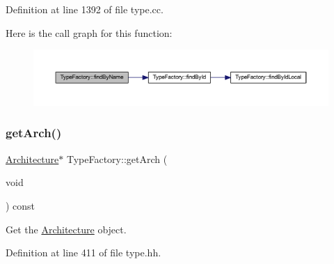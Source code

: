 Definition at line 1392 of file type.\+cc.

Here is the call graph for this function\+:
\nopagebreak
\begin{figure}[H]
\begin{center}
\leavevmode
\includegraphics[width=350pt]{class_type_factory_a5e139f5b338e423fd2b1beb7d941d30f_cgraph}
\end{center}
\end{figure}
\mbox{\label{class_type_factory_a216789e9300282a12e6bf22a4354ba6e}} 
\subsubsection{\texorpdfstring{getArch()}{getArch()}}
{\footnotesize\ttfamily \mbox{\hyperlink{class_architecture}{Architecture}}$\ast$ Type\+Factory\+::get\+Arch (\begin{DoxyParamCaption}\item[{void}]{ }\end{DoxyParamCaption}) const\hspace{0.3cm}{\ttfamily [inline]}}



Get the \mbox{\hyperlink{class_architecture}{Architecture}} object. 



Definition at line 411 of file type.\+hh.

